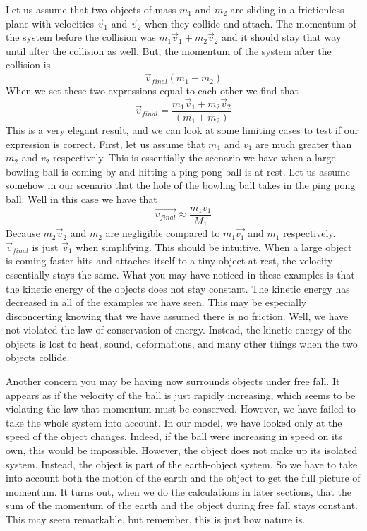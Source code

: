 \documentclass{article}[gray]
\numberwithin{equation}{subsection}
\begin{document}
Let us assume that two objects of mass $m_1$ and $m_2$ are sliding in a frictionless plane with velocities $\vec{v}_1$ and $\vec{v}_2$ when they collide and attach. The momentum of the system before the collision was $m_1\vec{v}_1+m_2\vec{v}_2$ and it should stay that way until after the collision as well. But, the momentum of the system after the collision is \begin{equation}\vec{v}_{final}\left(m_1+m_2 \right)\end{equation} When we set these two expressions equal to each other we find that \begin{equation}\vec{v}_{final}=\frac{m_1\vec{v}_1+m_2\vec{v}_2}{\left(m_1+m_2\right)}\end{equation} This is a very elegant result, and we can look at some limiting cases to test if our expression is correct. First, let us assume that $m_1$ and $v_1$ are much greater than $m_2$ and $v_2$ respectively. This is essentially the scenario we have when a large bowling ball is coming by and hitting a ping pong ball is at rest. Let us assume somehow in our scenario that the hole of the bowling ball takes in the ping pong ball. Well in this case we have that  $$\vec{v_{final}} \approx \frac{m_1 v_1}{M_1}$$ Because $m_2\vec{v}_2$ and $m_2$ are negligible compared to $m_1\vec{v_1}$ and $m_1$ respectively. $\vec{v}_{final}$ is just $\vec{v}_1$ when simplifying. This should be intuitive. When a large object is coming faster hits and attaches itself to a tiny object at rest, the velocity essentially stays the same. What you may have noticed in these examples is that the kinetic energy of the objects does not stay constant. The kinetic energy has decreased in all of the examples we have seen. This may be especially disconcerting knowing that we have assumed there is no friction. Well, we have not violated the law of conservation of energy. Instead, the kinetic energy of the objects is lost to heat, sound, deformations, and many other things when the two objects collide. 

Another concern you may be having now surrounds objects under free fall. It appears as if the velocity of the ball is just rapidly increasing, which seems to be violating the law that momentum must be conserved. However, we have failed to take the whole system into account. In our model, we have looked only at the speed of the object changes. Indeed, if the ball were increasing in speed on its own, this would be impossible. However, the object does not make up its isolated system. Instead, the object is part of the earth-object system. So we have to take into account both the motion of the earth and the object to get the full picture of momentum. It turns out, when we do the calculations in later sections, that the sum of the momentum of the earth and the object during free fall stays constant. This may seem remarkable, but remember, this is just how nature is. 
\end{document}

